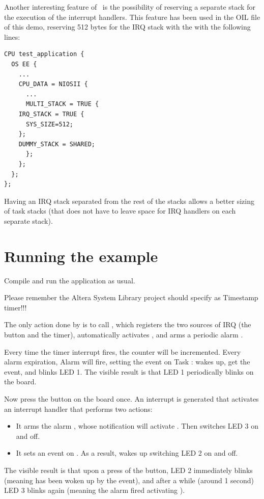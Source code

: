 Another interesting feature of \ee\ is the possibility of
reserving a separate stack for the execution of the interrupt
handlers. This feature has been used in the OIL file of this demo,
reserving 512 bytes for the IRQ stack with the with the following
lines:
\begin{lstlisting}
CPU test_application {
  OS EE {
    ...
    CPU_DATA = NIOSII {
      ...
      MULTI_STACK = TRUE {
	IRQ_STACK = TRUE {
	  SYS_SIZE=512;
	};
	DUMMY_STACK = SHARED;
      };
    };
  };
};
\end{lstlisting}

Having an IRQ stack separated from the rest of the stacks allows a
better sizing of task stacks (that does not have to leave space for
IRQ handlers on each separate stack).

\section{Running the example}
Compile and run the application as usual.

\begin{warning}
Please remember the Altera System Library project should specify
 as Timestamp timer!!!
\end{warning}

The only action done by  is to call , which
registers the two sources of IRQ (the button and the timer),
automatically activates , and arms a periodic alarm
.

Every time the timer interrupt fires, the counter 
will be incremented. Every alarm expiration, Alarm 
will fire, setting the event  on Task :
 wakes up, get the event, and blinks LED 1. The visible
result is that LED 1 periodically blinks on the board.

Now press the button on the board once. An interrupt is generated that activates an interrupt handler that performs  two actions:
\begin{itemize}
\item It arms the alarm , whose notification will
  activate . Then  switches LED 3 on and off.
\item It sets an event  on . As a result,
   wakes up switching LED 2 on and off.
\end{itemize}

The visible result is that upon a press of the button, LED 2
immediately blinks (meaning  has been woken up by the
event), and after a while (around 1 second) LED 3 blinks again
(meaning the alarm  fired activating ).

